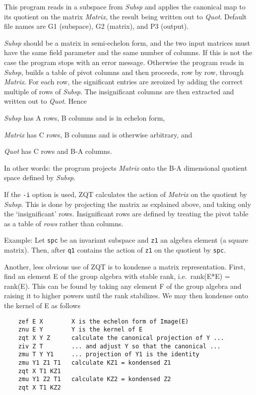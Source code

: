 \Description
This program reads in a subspace from {\em Subsp} and applies the
canonical map to its quotient on the matrix {\em Matrix}, the result
being written out to {\em Quot}. Default file names are G1 (subspace),
G2 (matrix), and P3 (output).

{\it Subsp} should be a matrix in semi-echelon form, and the two
input matrices must have the same field parameter and the same number
of columns. If this is not the case the program stops with an error
message.
Otherwise the program reads in {\it Subsp}, builds a table of pivot
columns and then proceeds, row by row, through {\it Matrix}. For
each row, the significant entries are zeroized by adding the correct
multiple of rows of {\it Subsp}. The insignificant columns are then
extracted and written out to {\em Quot}. Hence
\begin{list}{}{  \leftmargin 20mm}
  \item[\it Subsp\hfill] has A rows, B columns and is in echelon form,
  \item[\it Matrix\hfill] has C rows, B columns and is otherwise
  	arbitrary, and
  \item[\it Quot\hfill] has C rows and B-A columns.
\end{list}
In other words:
the program projects {\em Matrix} onto the B-A
dimensional quotient space defined by {\it Subsp}.

If the {\tt -i} option is used, ZQT calculates the action of
{\it Matrix} on the quotient by {\it Subsp}. This is done
by projecting the matrix as explained above, and taking only the
`insignificant' rows. Insignificant rows are defined by treating
the pivot table as a table of {\em rows} rather than columns.

Example: Let {\tt spc} be an invariant subspace and {\tt z1} an
algebra element (a square matrix). Then, after
{\tt q1} contains the action of {\tt z1} on the quotient by {\tt spc}.

Another, less obvious use of ZQT is to kondense a matrix
representation. First, find an element E of the group algebra with
stable rank, i.e.\ rank(E*E) = rank(E). This can be found by taking
any element F of the group algebra and raising it to higher powers
until the rank stabilizes. We may then kondense onto the kernel of E
as follows
\begin{verbatim}
    zef E X        X is the echelon form of Image(E)
    znu E Y        Y is the kernel of E
    zqt X Y Z      calculate the canonical projection of Y ...
    ziv Z T        ... and adjust Y so that the canonical ...
    zmu T Y Y1     ... projection of Y1 is the identity
    zmu Y1 Z1 T1   calculate KZ1 = kondensed Z1
    zqt X T1 KZ1
    zmu Y1 Z2 T1   calculate KZ2 = kondensed Z2
    zqt X T1 KZ2
\end{verbatim}

